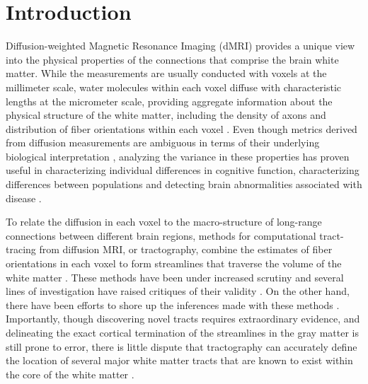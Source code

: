 \section*{Introduction}

Diffusion-weighted Magnetic Resonance Imaging (dMRI) provides a unique
view into the physical properties of the connections that comprise
the brain white matter. While the measurements are usually conducted
with voxels at the millimeter scale, water molecules within each voxel
diffuse with characteristic lengths at the micrometer scale, providing
aggregate information about the physical structure of the white matter,
including the density of axons and distribution of fiber
orientations within each voxel \cite{wandell2016clarifying}. Even though
metrics derived from diffusion measurements are ambiguous in terms
of their underlying biological interpretation \cite{Jones2013-xv},
analyzing the variance in these properties has proven useful in
characterizing individual differences in cognitive function,
characterizing differences between populations and detecting brain
abnormalities associated with disease \cite{Thomason2011-qn}.

To relate the diffusion in each voxel to the macro-structure of
long-range connections between different brain regions, methods for
computational tract-tracing from diffusion MRI, or tractography, combine
the estimates of fiber orientations in each voxel to form streamlines
that traverse the volume of the white matter \cite{Conturo1999-je,
Mori2002-qi}. These methods have been under increased scrutiny and
several lines of investigation have raised critiques of their validity
\cite{Maier-Hein2017-vb, Thomas2014-ki}. On the other hand, there
have been efforts to shore up the inferences made with these methods
\cite{Pestilli2014NatMeth, Takemura2016-sh, Smith2013-nc, Smith2015-cx,
Smith2015-zt, Rheault2018-wk}. Importantly, though discovering novel
tracts requires extraordinary evidence, and delineating
the exact cortical termination of the streamlines in the gray matter
is still prone to error, there is little dispute that tractography
can accurately define the location of several major white matter
tracts that are known to exist within the core of the white matter
\cite{Maier-Hein2017-vb}.

